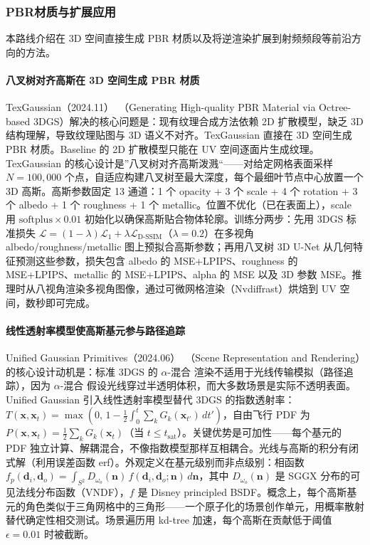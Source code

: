 \subsubsection{PBR材质与扩展应用}

本路线介绍在 3D 空间直接生成 PBR 材质以及将逆渲染扩展到射频频段等前沿方向的方法。

\paragraph{八叉树对齐高斯在 3D 空间生成 PBR 材质}

TexGaussian（2024.11）~\cite{2411_19654}（Generating High-quality PBR Material via Octree-based 3DGS）解决的核心问题是：现有纹理合成方法依赖 2D 扩散模型，缺乏 3D 结构理解，导致纹理贴图与 3D 语义不对齐。TexGaussian 直接在 3D 空间生成 PBR 材质。Baseline 的 2D 扩散模型只能在 UV 空间逐面片生成纹理。TexGaussian 的核心设计是”八叉树对齐高斯泼溅“——对给定网格表面采样 $N=100{,}000$ 个点，自适应构建八叉树至最大深度，每个最细叶节点中心放置一个 3D 高斯。高斯参数固定 13 通道：1 个 opacity + 3 个 scale + 4 个 rotation + 3 个 albedo + 1 个 roughness + 1 个 metallic。位置不优化（已在表面上），scale 用 $\text{softplus} \times 0.01$ 初始化以确保高斯贴合物体轮廓。训练分两步：先用 3DGS 标准损失 $\mathcal{L} = (1-\lambda)\mathcal{L}_1 + \lambda \mathcal{L}_{\text{D-SSIM}}$（$\lambda=0.2$）在多视角 albedo/roughness/metallic 图上预拟合高斯参数；再用八叉树 3D U-Net 从几何特征预测这些参数，损失包含 albedo 的 MSE+LPIPS、roughness 的 MSE+LPIPS、metallic 的 MSE+LPIPS、alpha 的 MSE 以及 3D 参数 MSE。推理时从八视角渲染多视角图像，通过可微网格渲染（Nvdiffrast）烘焙到 UV 空间，数秒即可完成。

\paragraph{线性透射率模型使高斯基元参与路径追踪}

Unified Gaussian Primitives（2024.06）~\cite{2406_09733}（Scene Representation and Rendering）的核心设计动机是：标准 3DGS 的 $\alpha$-混合 渲染不适用于光线传输模拟（路径追踪），因为 $\alpha$-混合 假设光线穿过半透明体积，而大多数场景是实际不透明表面。Unified Gaussian 引入线性透射率模型替代 3DGS 的指数透射率：$T(\mathbf{x}, \mathbf{x}_t) = \max\left(0, \, 1 - \frac{1}{2}\int_0^t \sum_k G_k(\mathbf{x}_{t'}) \, dt'\right)$，自由飞行 PDF 为 $P(\mathbf{x}, \mathbf{x}_t) = \frac{1}{2}\sum_k G_k(\mathbf{x}_t)$（当 $t \leq t_{\text{sat}}$）。关键优势是可加性——每个基元的 PDF 独立计算、解耦混合，不像指数模型那样互相耦合。光线与高斯的积分有闭式解（利用误差函数 erf）。外观定义在基元级别而非点级别：相函数 $f_p(\mathbf{d}_i, \mathbf{d}_o) = \int_{S^2} D_{\omega_o}(\mathbf{n}) \, f(\mathbf{d}_i, \mathbf{d}_o; \mathbf{n}) \, d\mathbf{n}$，其中 $D_{\omega_o}(\mathbf{n})$ 是 SGGX 分布的可见法线分布函数（VNDF），$f$ 是 Disney principled BSDF。概念上，每个高斯基元的角色类似于三角网格中的三角形——一个原子化的场景创作单元，用概率散射替代确定性相交测试。场景遍历用 kd-tree 加速，每个高斯在贡献低于阈值 $\epsilon=0.01$ 时被截断。

